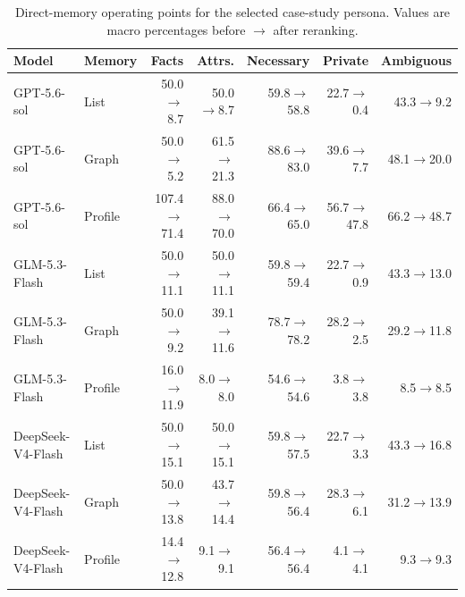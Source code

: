 \begin{table}[t]
\centering
\small
\setlength{\tabcolsep}{4pt}
\begin{tabular}{llrrrrr}
\toprule
Model & Memory & Facts & Attrs. & Necessary & Private & Ambiguous \\
\midrule
GPT-5.6-sol & List & 50.0$\rightarrow$8.7 & 50.0$\rightarrow$8.7 & 59.8$\rightarrow$58.8 & 22.7$\rightarrow$0.4 & 43.3$\rightarrow$9.2 \\
GPT-5.6-sol & Graph & 50.0$\rightarrow$5.2 & 61.5$\rightarrow$21.3 & 88.6$\rightarrow$83.0 & 39.6$\rightarrow$7.7 & 48.1$\rightarrow$20.0 \\
GPT-5.6-sol & Profile & 107.4$\rightarrow$71.4 & 88.0$\rightarrow$70.0 & 66.4$\rightarrow$65.0 & 56.7$\rightarrow$47.8 & 66.2$\rightarrow$48.7 \\
GLM-5.3-Flash & List & 50.0$\rightarrow$11.1 & 50.0$\rightarrow$11.1 & 59.8$\rightarrow$59.4 & 22.7$\rightarrow$0.9 & 43.3$\rightarrow$13.0 \\
GLM-5.3-Flash & Graph & 50.0$\rightarrow$9.2 & 39.1$\rightarrow$11.6 & 78.7$\rightarrow$78.2 & 28.2$\rightarrow$2.5 & 29.2$\rightarrow$11.8 \\
GLM-5.3-Flash & Profile & 16.0$\rightarrow$11.9 & 8.0$\rightarrow$8.0 & 54.6$\rightarrow$54.6 & 3.8$\rightarrow$3.8 & 8.5$\rightarrow$8.5 \\
DeepSeek-V4-Flash & List & 50.0$\rightarrow$15.1 & 50.0$\rightarrow$15.1 & 59.8$\rightarrow$57.5 & 22.7$\rightarrow$3.3 & 43.3$\rightarrow$16.8 \\
DeepSeek-V4-Flash & Graph & 50.0$\rightarrow$13.8 & 43.7$\rightarrow$14.4 & 59.8$\rightarrow$56.4 & 28.3$\rightarrow$6.1 & 31.2$\rightarrow$13.9 \\
DeepSeek-V4-Flash & Profile & 14.4$\rightarrow$12.8 & 9.1$\rightarrow$9.1 & 56.4$\rightarrow$56.4 & 4.1$\rightarrow$4.1 & 9.3$\rightarrow$9.3 \\
\bottomrule
\end{tabular}
\caption{Direct-memory operating points for the selected case-study persona. Values are macro percentages before $\rightarrow$ after reranking.}
\label{tab:direct-memory-operating-points-export}
\end{table}
